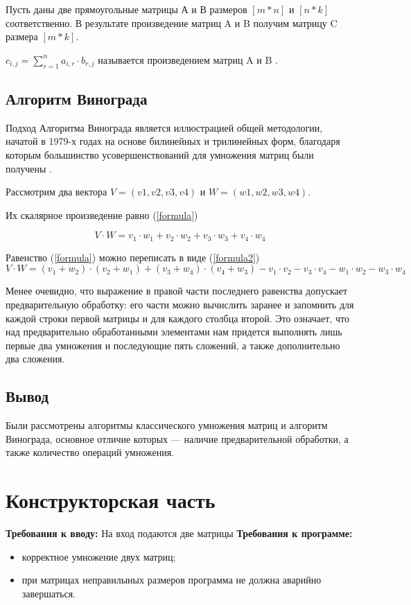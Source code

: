 \documentclass[12pt]{report}
\begin{document}
Пусть даны две прямоугольные матрицы А и В размеров $[m * n]$ и $[n * k]$ соответственно.  
В результате произведение матриц A и B получим матрицу C размера $[m *  k]$.


$c_{i,j} = \sum\limits_{r=1}^n a_{i,r}\cdot b_{r,j}$ называется произведением матриц A и B \cite{Beloysov}.


\section{Алгоритм Винограда}
Подход Алгоритма Винограда является иллюстрацией общей методологии, начатой в 1979-х годах на основе
билинейных и трилинейных форм, благодаря которым большинство усовершенствований для умножения матриц были получены \cite{Gall2012}.

Рассмотрим два вектора $V = (v1, v2, v3, v4)$ и $W = (w1, w2, w3, w4)$.  

 Их скалярное произведение равно (\ref{formula}) 

\begin{equation} \label{formula}
V \cdot W=v_1 \cdot w_1 + v_2 \cdot w_2 + v_3 \cdot w_3 + v_4 \cdot w_4
\end{equation}

Равенство (\ref{formula}) можно переписать в виде (\ref{formula2}) 
\begin{equation} \label{formula2}
V \cdot W=(v_1 + w_2) \cdot (v_2 + w_1) + (v_3 + w_4) \cdot (v_4 + w_3) - v_1 \cdot v_2 - v_3 \cdot v_4 - w_1 \cdot w_2 - w_3 \cdot w_4
\end{equation}

Менее очевидно, что выражение в правой части последнего равенства допускает предварительную обработку: его части можно вычислить заранее и запомнить для каждой строки первой матрицы и для каждого столбца второй. 
Это означает, что над предварительно обработанными элементами нам придется выполнять лишь первые два умножения и последующие пять сложений, а также дополнительно два сложения. 

\section{Вывод}
Были рассмотрены алгоритмы классического умножения матриц и алгоритм Винограда, основное отличие которых — наличие предварительной обработки, а также количество операций умножения.



\chapter{Конструкторская часть}
\textbf{Требования к вводу:}
На вход подаются две матрицы
\newline
\textbf{Требования к программе:}
\begin{itemize}
\item корректное умножение двух матриц;
\item при матрицах неправилыных размеров программа не должна аварийно завершаться.
\end{itemize}
\end{document}
